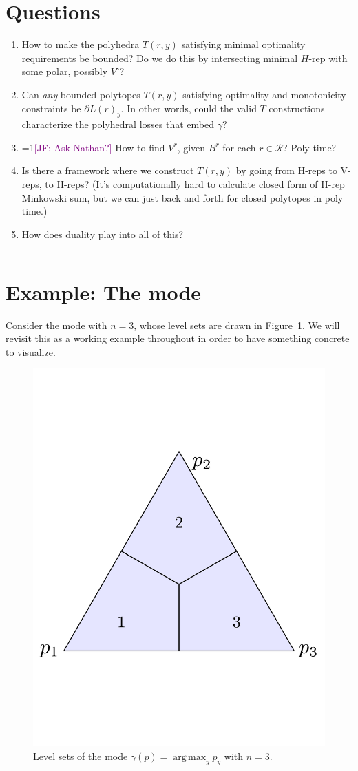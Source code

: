 \documentclass[12pt]{article}
\newcommand{\Comments}{1}
\newcommand{\mynote}[2]{\ifnum\Comments=1\textcolor{#1}{#2}\fi}
\newcommand{\jessie}[1]{\mynote{purple}{[JF: #1]}}
\newcommand{\R}{\mathcal{R}}
\DeclareMathOperator*{\argmax}{arg\,max}
\begin{document}
\section*{Questions}
\begin{enumerate}
	\item How to make the polyhedra $T(r,y)$ satisfying minimal optimality requirements be bounded? Do we do this by intersecting minimal $H$-rep with some polar, possibly $V^\circ$? 
	\item Can \emph{any} bounded polytopes $T(r,y)$ satisfying optimality and monotonicity constraints be $\partial L(r)_y$.  In other words, could the valid $T$ constructions characterize the polyhedral losses that embed $\gamma$?
	\item \jessie{Ask Nathan?} How to find $V^r$, given $B^r$ for each $r \in \R$?  Poly-time?
	\item Is there a framework where we construct $T(r,y)$ by going from H-reps to V-reps, to H-reps?  (It's computationally hard to calculate closed form of H-rep Minkowski sum, but we can just back and forth for closed polytopes in poly time.)
	\item How does duality play into all of this?  
\end{enumerate}

\bigskip \hrule \bigskip
\section*{Example: The mode}
Consider the mode with $n=3$, whose level sets are drawn in Figure~\ref{fig:mode-simplex}.
We will revisit this as a working example throughout in order to have something concrete to visualize.

\begin{figure}
	\centering
	\includegraphics[width=0.5\linewidth]{figs/mode-simplex}
	\caption{Level sets of the mode $\gamma(p) = \argmax_y p_y$ with $n=3$.}
	\label{fig:mode-simplex}
\end{figure}
\end{document}

